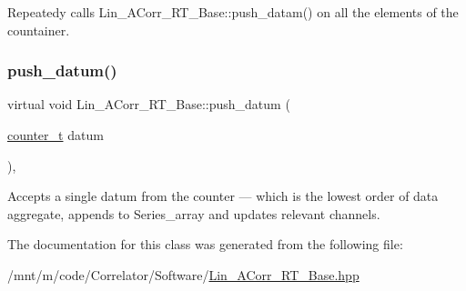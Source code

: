 Repeatedy calls {\ttfamily Lin\+\_\+\+A\+Corr\+\_\+\+R\+T\+\_\+\+Base\+::push\+\_\+datam()} on all the elements of the countainer. 

\mbox{\label{classLin__ACorr__RT__Base_a398167525faf2a65f29722e943a0c57e}} 
\subsubsection{\texorpdfstring{push\+\_\+datum()}{push\_datum()}}
{\footnotesize\ttfamily virtual void Lin\+\_\+\+A\+Corr\+\_\+\+R\+T\+\_\+\+Base\+::push\+\_\+datum (\begin{DoxyParamCaption}\item[{\hyperlink{types_8hpp_ac89ac912f524b3e3fa3720ea55fec966}{counter\+\_\+t}}]{datum }\end{DoxyParamCaption})\hspace{0.3cm}{\ttfamily [inline]}, {}}



Accepts a single {\ttfamily datum} from the counter — which is the lowest order of data aggregate, appends to Series\+\_\+array and updates relevant channels. 



The documentation for this class was generated from the following file\+:\begin{DoxyCompactItemize}
\item 
/mnt/m/code/\+Correlator/\+Software/\hyperlink{Lin__ACorr__RT__Base_8hpp}{Lin\+\_\+\+A\+Corr\+\_\+\+R\+T\+\_\+\+Base.\+hpp}\end{DoxyCompactItemize}
